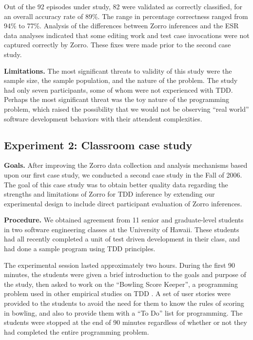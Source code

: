 \documentclass[smallextended]{svjour3}     %
\begin{document}
Out of the 92 episodes under study, 82 were validated as correctly
classified, for an overall accuracy rate of 89\%.  The range in percentage
correctness ranged from 94\% to 77\%.  Analysis of the differences between
Zorro inferences and the ESR data analyses indicated that some editing work
and test case invocations were not captured correctly by Zorro.  These
fixes were made prior to the second case study.

{\bf Limitations.}  The most significant threats to validity of this study
were the sample size, the sample population, and the nature of the problem.
The study had only seven participants, some of whom were not experienced
with TDD.  Perhaps the most significant threat was the toy nature of the
programming problem, which raised the possibility that we would not be
observing ``real world'' software development behaviors with their
attendent complexities.

\subsection{Experiment 2: Classroom case study}

{\bf Goals.}  After improving the Zorro data collection and analysis
mechanisms based upon our first case study, we conducted a second case
study in the Fall of 2006.  The goal of this case study was to obtain
better quality data regarding the strengths and limitations of Zorro for
TDD inference by extending our experimental design to include direct
participant evaluation of Zorro inferences.

{\bf Procedure.}  We obtained agreement from 11 senior and graduate-level
students in two software engineering classes at the University of Hawaii.
These students had all recently completed a unit of test driven development
in their class, and had done a sample program using TDD principles.

The experimental session lasted approximately two hours. During the first
90 minutes, the students were given a brief introduction to the goals and
purpose of the study, then asked to work on the ``Bowling Score Keeper'', a
programming problem used in other empirical studies on TDD
\citep{George:03,Erdogmus:05}.  A set of user stories were provided to the
students to avoid the need for them to know the rules of scoring in
bowling, and also to provide them with a ``To Do'' list for programming.
The students were stopped at the end of 90 minutes regardless of whether or
not they had completed the entire programming problem.
\end{document}
